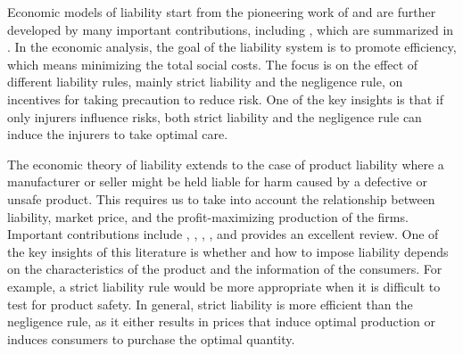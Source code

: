 \label{sec:background}



Economic models of liability start from the pioneering work of \cite{brown1973toward} and are further developed by many important contributions, including \cite{shavell1980strict}, which are summarized in \cite{shavell2009accident}. 
In the economic analysis, the goal of the liability system is to promote efficiency, which means minimizing the total social costs.  
The focus is on the effect of different liability rules, mainly strict liability and the negligence rule, on incentives for taking precaution to reduce risk. 
One of the key insights is that if only injurers influence risks, both strict liability and the negligence rule can induce the injurers to take optimal care.  

The economic theory of liability extends to the case of product liability where a manufacturer or seller might be held liable for harm caused by a defective or unsafe product. 
This requires us to take into account the relationship between liability, market price, and the profit-maximizing production of the firms. 
Important contributions include \cite{hamada1976liability}, \cite{polinsky1980strict}, \cite{landes1985positive}, \cite{polinsky2010uneasy}, and \cite{daughety2013economic} provides an excellent review. 
One of the key insights of this literature is whether and how to impose liability depends on the characteristics of the product and the information of the consumers.  
For example, a strict liability rule would be more appropriate when it is difficult to test for product safety.
In general, strict liability is more efficient than the negligence rule, as it either results in prices that induce optimal production or induces consumers to purchase the optimal quantity. 

